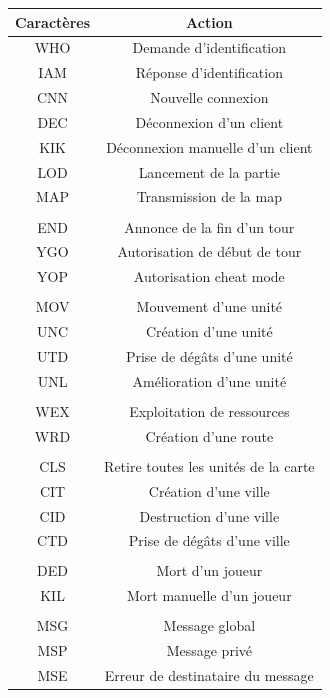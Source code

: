 \documentclass[12pt]{report}
\begin{document}
\vspace{0.5cm}

\begin{center}
	\begin{tabular}{c|c}
		\toprule
		\textbf{Caractères}  & \textbf{Action}\\ 
		\midrule
		WHO & Demande d’identification \\
		IAM & Réponse d'identification \\
		CNN & Nouvelle connexion \\
		DEC & Déconnexion d’un client \\
        KIK & Déconnexion manuelle d’un client \\
        LOD & Lancement de la partie \\
		MAP & Transmission de la map \\
        \\
		END & Annonce de la fin d’un tour \\
		YGO & Autorisation de début de tour\\
        YOP & Autorisation cheat mode\\
        \\
		MOV & Mouvement d’une unité\\
        UNC & Création d'une unité\\
        UTD & Prise de dégâts d'une unité\\
        UNL & Amélioration d'une unité\\
        \\
        WEX & Exploitation de ressources\\
        WRD & Création d'une route\\
        \\
        CLS & Retire toutes les unités de la carte\\
        CIT & Création d'une ville\\
        CID & Destruction d'une ville\\
        CTD & Prise de dégâts d'une ville\\
        \\
        DED & Mort d'un joueur\\
        KIL & Mort manuelle d'un joueur\\
        \\
		MSG & Message global\\
		MSP & Message privé\\
		MSE & Erreur de destinataire du message\\
		\bottomrule
	\end{tabular}
\end{center}
\end{document}
